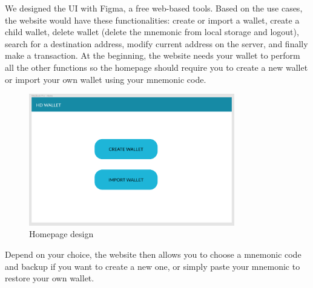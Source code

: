 We designed the UI with Figma, a free web-based tools. Based on the use cases, the website would have these functionalities: create or import a wallet, create a child wallet, delete wallet (delete the mnemonic from local storage and logout), search for a destination address, modify current address on the server, and finally make a transaction. At the beginning, the website needs your wallet to perform all the other functions so the homepage should require you to create a new wallet or import your own wallet using your mnemonic code.

\begin{figure}[!h]
  \centering
  \includegraphics[width=0.8\textwidth]{images/component01.png}
  \caption[Homepage design]{Homepage design}
  \label{fig:homepage_desgin}
\end{figure}


Depend on your choice, the website then allows you to choose a mnemonic code and backup if you want to create a new one, or simply paste your mnemonic to restore your own wallet.

